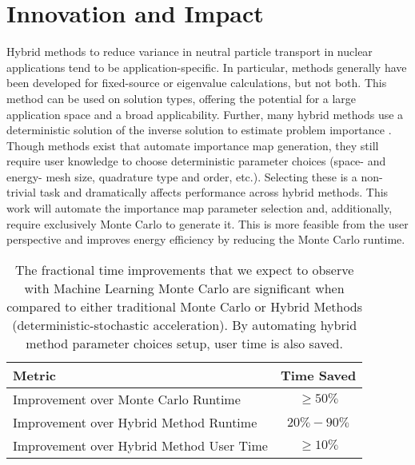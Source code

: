 \documentclass[letterpaper,12pt]{article}
\begin{document}
\section{Innovation and Impact}
Hybrid methods to reduce variance in neutral particle transport in nuclear
applications tend to be application-specific. In particular, methods generally
have been developed for fixed-source or eigenvalue calculations, but not both.
This method can be used on solution types, offering the potential for
a large application space and a broad applicability. Further, many hybrid
methods use a deterministic solution of the inverse solution to estimate problem
importance\cite{wagner_automated_1998, wagner_automated_2009,
haghighat_monte_2003, zhang_adjoint-based_2011, hoogenboom_optimum_1979} . Though methods exist that automate importance map
generation\cite{hendricks_mcnp_1985, burn_optimizing_2014,
  van_wijk_easy_2011, wagner_automated_1998, wagner_automated_2009,
haghighat_monte_2003, zhang_adjoint-based_2011, hoogenboom_optimum_1979},
they still require user knowledge to choose deterministic
parameter choices (space- and energy- mesh size, quadrature type and order,
etc.). Selecting these is a non-trivial task and dramatically affects performance
across hybrid methods. This work will automate the importance map parameter selection
and, additionally, require exclusively Monte Carlo to generate it. This is more
feasible from the user perspective and improves energy efficiency by reducing
the Monte Carlo runtime.
\FloatBarrier

\begin{table}
  \centering
    \begin{tabular}{  l  c  }
     \hline
     \textbf{Metric} & \textbf{Time Saved}\\ \hline
     Improvement over Monte Carlo Runtime & $\ge50\%$  \\
     Improvement over Hybrid Method Runtime & $20\%-90\%$ \\
     Improvement over Hybrid Method User Time & $\ge10\%$ \\
     \hline
    \end{tabular}
    \caption{The fractional time improvements that we expect  to observe with Machine 
            Learning Monte Carlo are significant when compared to either 
            traditional Monte Carlo or Hybrid Methods (deterministic-stochastic 
            acceleration). By automating hybrid method parameter choices setup, 
    user time is also saved.}
   \label{tab:improve}
\end{table}
\end{document}
